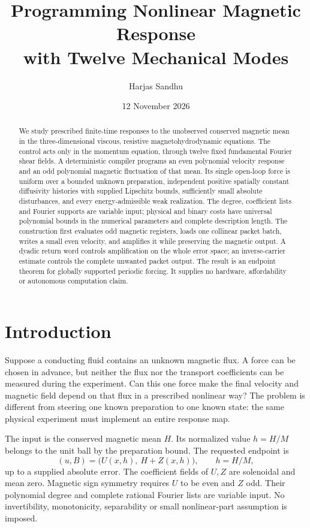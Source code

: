 \documentclass[11pt,a4paper]{amsart}
\title[Nonlinear magnetic response]{Programming Nonlinear Magnetic Response\\ with Twelve Mechanical Modes}
\author{Harjas Sandhu}
\date{12 November 2026}
\theoremstyle{definition}
\theoremstyle{remark}
\numberwithin{equation}{section}
\begin{document}
\begin{abstract}
We study prescribed finite-time responses to the unobserved conserved magnetic
mean in the three-dimensional viscous, resistive magnetohydrodynamic equations.
The control acts only in the momentum equation, through twelve fixed fundamental
Fourier shear fields. A deterministic compiler programs an even polynomial
velocity response and an odd polynomial magnetic fluctuation of that mean.
Its single open-loop force is uniform over a bounded unknown preparation,
independent positive spatially constant diffusivity histories with supplied
Lipschitz bounds, sufficiently small absolute disturbances, and every
energy-admissible weak realization. The degree, coefficient lists and Fourier
supports are variable input; physical and binary costs have universal
polynomial bounds in the numerical parameters and complete description length.
The construction first evaluates odd magnetic registers, loads one collinear
packet batch, writes a small even velocity, and amplifies it while preserving
the magnetic output. A dyadic return word controls amplification on the whole
error space; an inverse-carrier estimate controls the complete unwanted packet
output. The result is an endpoint theorem for globally supported periodic
forcing. It supplies no hardware, affordability or autonomous computation claim.
\end{abstract}

\maketitle
\raggedbottom
\section{Introduction}
Suppose a conducting fluid contains an unknown magnetic flux. A force can be
chosen in advance, but neither the flux nor the transport coefficients can be
measured during the experiment. Can this one force make the final velocity and
magnetic field depend on that flux in a prescribed nonlinear way? The problem
is different from steering one known preparation to one known state: the same
physical experiment must implement an entire response map.

The input is the conserved magnetic mean $H$. Its normalized value $h=H/M$
belongs to the unit ball by the preparation bound. The requested endpoint is
\begin{equation}\label{eq:intro-endpoint}
 (u,B)=\bigl(U(x,h),\ H+Z(x,h)\bigr),\qquad h=H/M,
\end{equation}
up to a supplied absolute error. The coefficient fields of $U,Z$ are
solenoidal and mean zero. Magnetic sign symmetry requires $U$ to be even and
$Z$ odd. Their polynomial degree and complete rational Fourier lists are
variable input. No invertibility, monotonicity, separability or small
nonlinear-part assumption is imposed.
\end{document}
